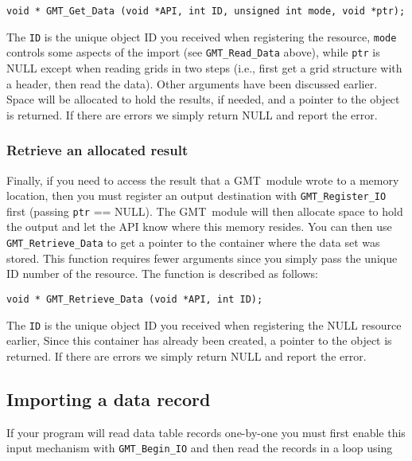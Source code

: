 \documentclass[11pt]{report}
\begin{document}

\begin{verbatim}
void * GMT_Get_Data (void *API, int ID, unsigned int mode, void *ptr);
\end{verbatim}
The \texttt{ID} is the unique object ID you received when registering the resource,
\texttt{mode} controls some aspects of the import (see \texttt{GMT\_Read\_Data} above),
while \texttt{ptr} is NULL except when reading grids in two steps
(i.e., first get a grid structure with a header, then read the data).
Other arguments have been discussed earlier.  
Space will be allocated to hold the results, if needed, and a pointer to the object is returned.
If there are errors we simply return NULL and report the error.

\subsubsection{Retrieve an allocated result}

Finally, if you need to access the result that a GMT\ module wrote to a memory location,
then you must register an output destination with \texttt{GMT\_Register\_IO} first (passing \texttt{ptr} == NULL).
The GMT\ module will then allocate space to hold the output and let the API know where this memory resides.
You can then use \texttt{GMT\_Retrieve\_Data} to get a pointer to the container where the data set was stored.
This function requires fewer arguments since you simply
pass the unique ID number of the resource.  The function is described as follows:


\begin{verbatim}
void * GMT_Retrieve_Data (void *API, int ID);
\end{verbatim}
The \texttt{ID} is the unique object ID you received when registering the NULL resource earlier,
Since this container has already been created, a pointer to the object is returned.
If there are errors we simply return NULL and report the error.

\subsection{Importing a data record}

If your program will read data table records one-by-one you must first
enable this input mechanism with \texttt{GMT\_Begin\_IO} and then read
the records in a loop using
\end{document}
